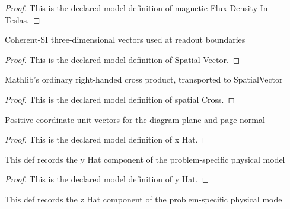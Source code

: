 \begin{proof}
  This is the declared model definition of magnetic Flux Density In Teslas.
\end{proof}
\begin{definition}
  \label{def:physics:phyx-mini-0960:phyxminiproblems-problemphyxmini0960-spatialvector}
  Coherent-SI three-dimensional vectors used at readout boundaries
\end{definition}
\begin{proof}
  This is the declared model definition of Spatial Vector.
\end{proof}
\begin{definition}
  \label{def:physics:phyx-mini-0960:phyxminiproblems-problemphyxmini0960-spatialcross}
  Mathlib's ordinary right-handed cross product, transported to SpatialVector
\end{definition}
\begin{proof}
  This is the declared model definition of spatial Cross.
\end{proof}
\begin{definition}[x Hat]
  \label{def:physics:phyx-mini-0960:phyxminiproblems-problemphyxmini0960-xhat}
  Positive coordinate unit vectors for the diagram plane and page normal
\end{definition}
\begin{proof}
  This is the declared model definition of x Hat.
\end{proof}
\begin{definition}[y Hat]
  \label{def:physics:phyx-mini-0960:phyxminiproblems-problemphyxmini0960-yhat}
  This def records the y Hat component of the problem-specific physical model
\end{definition}
\begin{proof}
  This is the declared model definition of y Hat.
\end{proof}
\begin{definition}[z Hat]
  \label{def:physics:phyx-mini-0960:phyxminiproblems-problemphyxmini0960-zhat}
  This def records the z Hat component of the problem-specific physical model
\end{definition}
